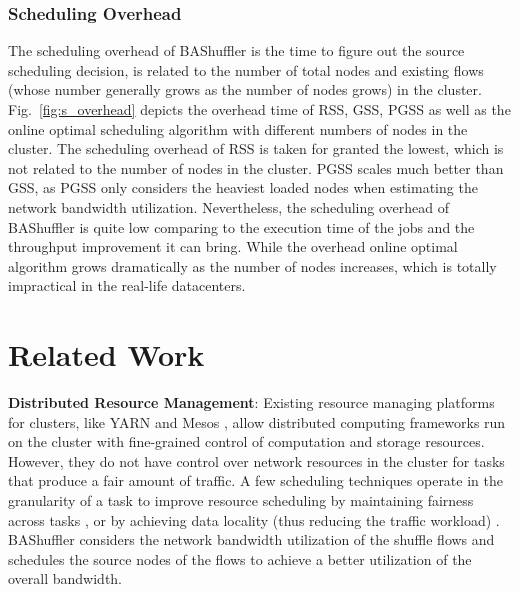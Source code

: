 \documentclass[10pt,journal,compsoc]{IEEEtran}
\begin{document}
\subsubsection{Scheduling Overhead}\label{section:eva_overhead}
The scheduling overhead of BAShuffler is the time to figure out the source scheduling decision, is related to the number of total nodes and existing flows (whose number generally grows as the number of nodes grows) in the cluster. 
Fig.~\ref{fig:s_overhead} depicts the overhead time of RSS, GSS, PGSS as well as the online optimal scheduling algorithm
with different numbers of nodes in the cluster.
The scheduling overhead of RSS is taken for granted the lowest, which is not related to the number of nodes in the cluster. 
PGSS scales much better than GSS, as PGSS only considers the heaviest loaded nodes when estimating the network bandwidth utilization. 
Nevertheless, the scheduling overhead of BAShuffler is quite low comparing to the execution time of the jobs and the throughput improvement it can bring. 
While the overhead online optimal algorithm grows dramatically as the number of nodes increases, which is totally impractical in the real-life datacenters. 




\section{Related Work}\label{section:relatedwork}
\textbf{Distributed Resource Management}:
Existing resource managing platforms for clusters, like YARN
\cite{vavilapalli2013apache} and Mesos \cite{hindman2011mesos},
allow distributed computing frameworks run on the cluster with
fine-grained control of computation and storage resources.
However, they do not have control over network resources in the cluster for
tasks that produce a fair amount of traffic.
A few scheduling techniques operate in the granularity of a task to improve
resource scheduling by maintaining fairness across tasks
\cite{zaharia2010delay, isard2009quincy},
or by achieving data locality (thus reducing the traffic workload)
\cite{dean2008mapreduce, zaharia2008improving,faraz2014shufflewatcher}.
BAShuffler considers the network bandwidth utilization of the shuffle
flows and schedules the source nodes of the flows to achieve a better
utilization of the overall bandwidth.
\end{document}
